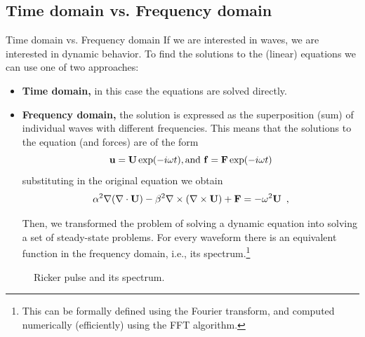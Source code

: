 \documentclass{beamer}
\begin{document}
\subsection{Time domain vs. Frequency domain}
\begin{frame}[allowframebreaks]{Time domain vs. Frequency domain}
If we are interested in waves, we are interested in dynamic behavior. To find the solutions to the (linear) equations  we can use one of two approaches:
\begin{itemize}
\item \textbf{Time domain,} in this case the equations are solved directly.
\item \textbf{Frequency domain,} the solution is expressed as the superposition (sum) of individual waves with different frequencies. This means that the solutions to the equation (and forces) are of the form
\[\bold{u} = \bold{U} \exp(-i\omega t), \text{and } \bold{f} = \bold{F} \exp(-i\omega t)\]
substituting in the original equation we obtain
\begin{equation}
 \alpha^2\nabla(\nabla \cdot \bold{U}) - \beta^2\nabla \times (\nabla \times \bold{U})  + \bold{F} = -\omega^2\bold{U} \enspace ,
\label{eq:navier_freq}
\end{equation}

\pagebreak
Then, we transformed the problem of solving a dynamic equation into solving a set of steady-state problems. For every waveform there is an equivalent function in the frequency domain, i.e., its spectrum.\footnote{This can be formally defined using the Fourier transform, and computed numerically (efficiently) using the FFT algorithm.}
\end{itemize}

\begin{figure}[h]
\centering
{}\qquad
{}
\caption{Ricker pulse and its spectrum.}

\end{figure}
\end{frame}
\end{document}
